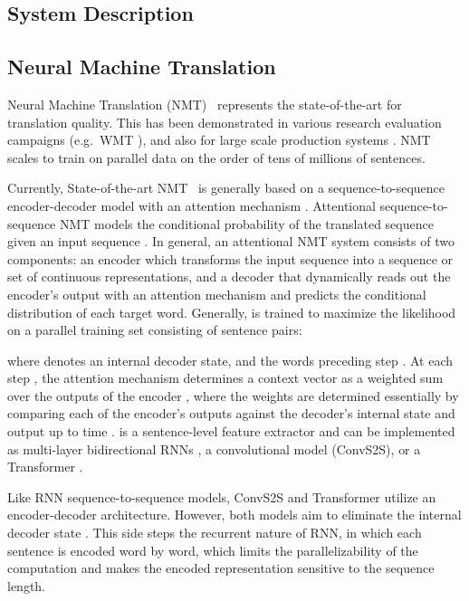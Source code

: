 \documentclass[a4paper]{article}
\begin{document}
\begin{CJK*}{UTF8}{gbsn}
\section{System Description}
\label{sec:sys-desc}
\subsection{Neural Machine Translation}
Neural Machine Translation (NMT)~\cite{bahdanau2014neural} represents the state-of-the-art for translation quality. This has been demonstrated in various research evaluation campaigns (e.g.~WMT \cite{bojar-EtAl:2017:WMT1}), and also for large scale production systems \cite{wu2016google,devlin:2017:EMNLP2017}. NMT scales to train on parallel data on the order of tens of millions of sentences.

Currently, State-of-the-art NMT~\cite{bahdanau2014neural,sutskever2014sequence} is generally based on a sequence-to-sequence encoder-decoder model  with an attention mechanism \cite{bahdanau2014neural}. Attentional sequence-to-sequence NMT models the conditional probability  of the translated sequence  given an input sequence .  
In general, an attentional NMT system  consists of two components: an encoder  which transforms the input sequence into a sequence or set of continuous representations,
and a decoder  that dynamically reads out the encoder's output with an attention mechanism and predicts the conditional distribution of each target word. 
Generally,  is trained to maximize the likelihood on a parallel training set consisting of  sentence pairs: 

where  denotes an internal decoder state, and  the words preceding step . At each step , the attention mechanism  determines a context vector as a weighted sum over the outputs of the encoder , where the weights
are determined essentially by comparing each of the encoder's outputs
against the decoder's internal state and output up to time .
 is a sentence-level feature extractor and can be implemented as multi-layer bidirectional RNNs \cite{bahdanau2014neural,wu2016google}, a convolutional model (ConvS2S), \cite{gehring2017convolutional} or a Transformer \cite{vaswani2017attention}. 

Like RNN sequence-to-sequence models, ConvS2S and Transformer utilize an encoder-decoder architecture. However, both models aim to eliminate the internal decoder state . This side steps the recurrent nature of RNN, in which each sentence is encoded word by word, which limits the parallelizability of the computation and makes the encoded representation  sensitive to the sequence length. 


\end{CJK*}
\end{document}
